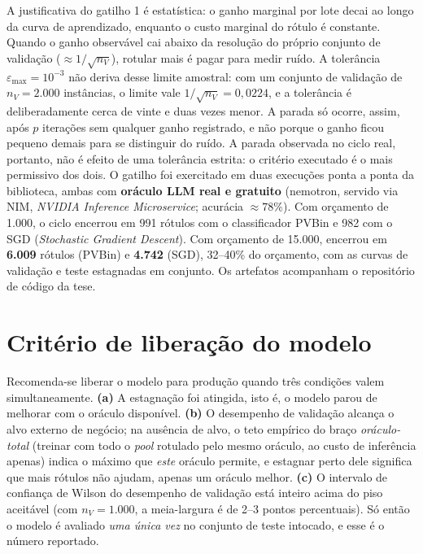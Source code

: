 A justificativa do gatilho 1 é estatística: o ganho marginal por lote decai
ao longo da curva de aprendizado, enquanto o custo marginal do rótulo é
constante. Quando o ganho observável cai abaixo da resolução do próprio
conjunto de validação ($\approx 1/\sqrt{n_V}$), rotular mais é pagar para
medir ruído. A tolerância
$\varepsilon_{\max}=10^{-3}$ não deriva desse limite amostral: com
um conjunto de validação de $n_V = 2.000$ instâncias, o limite vale
$1/\sqrt{n_V} = 0{,}0224$, e a tolerância é deliberadamente cerca de vinte e
duas vezes menor. A parada só ocorre, assim, após $p$ iterações sem qualquer
ganho registrado, e não porque o ganho ficou pequeno demais para se
distinguir do ruído. A parada observada no ciclo real,
portanto, não é efeito de uma tolerância estrita: o critério executado é o
mais permissivo dos dois. O gatilho foi exercitado em duas execuções ponta a ponta da biblioteca,
ambas com \textbf{oráculo LLM real e gratuito} (nemotron, servido via NIM,
\textit{NVIDIA Inference Microservice}; acurácia $\approx 78\%$). Com
orçamento de 1.000, o ciclo encerrou em 991 rótulos com o classificador
PVBin e 982 com o SGD (\textit{Stochastic Gradient Descent}). Com orçamento
de 15.000, encerrou em \textbf{6.009} rótulos (PVBin) e \textbf{4.742}
(SGD), 32--40\% do orçamento, com as curvas de validação e teste estagnadas
em conjunto. Os artefatos acompanham o
repositório de código da tese.

\section{Critério de liberação do modelo}
\label{ap:liberacao}

Recomenda-se liberar o modelo para produção quando três condições valem
simultaneamente. \textbf{(a)} A estagnação foi atingida, isto é, o modelo
parou de melhorar com o oráculo disponível. \textbf{(b)} O desempenho de
validação alcança o alvo externo de negócio; na ausência de alvo, o teto
empírico do braço \emph{oráculo-total} (treinar com todo o \textit{pool}
rotulado pelo mesmo oráculo, ao custo de inferência apenas) indica o máximo
que \emph{este} oráculo permite, e estagnar perto dele significa que mais
rótulos não ajudam, apenas um oráculo melhor. \textbf{(c)} O intervalo de
confiança de Wilson do desempenho de validação está inteiro acima do piso
aceitável (com $n_V = 1.000$, a meia-largura é de 2--3 pontos percentuais).
Só então o
modelo é avaliado \emph{uma única vez} no conjunto de teste intocado, e esse
é o número reportado.

